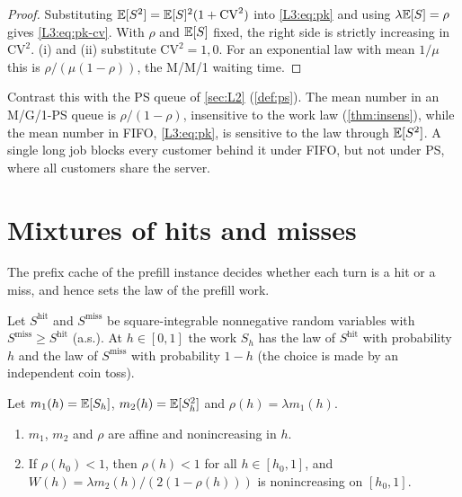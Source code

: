 \begin{proof}
Substituting $\mathbb{E}[S^2]=\mathbb{E}[S]^2(1+\mathrm{CV}^2)$ into \cref{L3:eq:pk} and using
$\lambda\mathbb{E}[S]=\rho$ gives \cref{L3:eq:pk-cv}. With $\rho$ and $\mathbb{E}[S]$ fixed, the
right side is strictly increasing in $\mathrm{CV}^2$. (i) and (ii) substitute
$\mathrm{CV}^2=1,0$. For an exponential law with mean $1/\mu$ this is
$\rho/(\mu(1-\rho))$, the M/M/1 waiting time.
\end{proof}

\begin{remark}
Contrast this with the PS queue of \cref{sec:L2} (\cref{def:ps}). The mean number
in an M/G/1-PS queue is $\rho/(1-\rho)$, insensitive to the work law
(\cref{thm:insens}), while the mean number in FIFO, \cref{L3:eq:pk}, is sensitive
to the law through $\mathbb{E}[S^2]$. A single long job blocks every customer behind it
under FIFO, but not under PS, where all customers share the server.
\end{remark}

\section{Mixtures of hits and misses}

The prefix cache of the prefill instance decides whether each turn is a hit or a
miss, and hence sets the law of the prefill work.

\begin{definition}\label{L3:def:mixture}
Let $S^{\mathrm{hit}}$ and $S^{\mathrm{miss}}$ be square-integrable nonnegative
random variables with $S^{\mathrm{miss}}\ge S^{\mathrm{hit}}$ (a.s.). At
 $h\in[0,1]$ the work $S_h$ has the law of $S^{\mathrm{hit}}$ with
probability $h$ and the law of $S^{\mathrm{miss}}$ with probability $1-h$ (the
choice is made by an independent coin toss).
\end{definition}

\begin{corollary}\label{cor:mixture}
Let $m_1(h)=\mathbb{E}[S_h]$, $m_2(h)=\mathbb{E}[S_h^2]$ and $\rho(h)=\lambda m_1(h)$.
\begin{enumerate}[label=(\roman*)]
\item $m_1$, $m_2$ and $\rho$ are affine and nonincreasing in $h$.
\item If $\rho(h_0)<1$, then $\rho(h)<1$ for all $h\in[h_0,1]$, and
  $W(h)=\lambda m_2(h)/(2(1-\rho(h)))$ is nonincreasing on $[h_0,1]$.
\end{enumerate}
\end{corollary}

